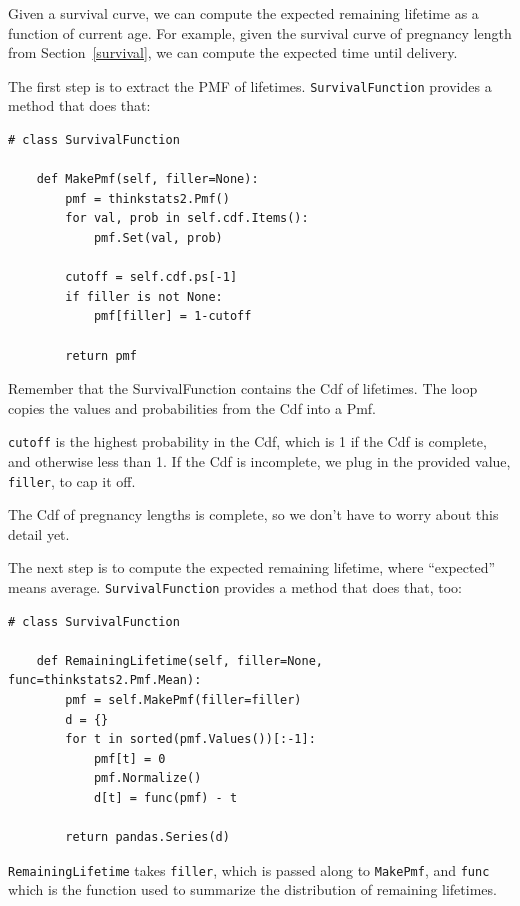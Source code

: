\documentclass[12pt]{book}
\theoremstyle{exercise}
\begin{document}
Given a survival curve, we can compute the expected remaining
lifetime as a function of current age.  For example, given the
survival curve of pregnancy length from Section~\ref{survival},
we can compute the expected time until delivery.%

The first step is to extract the PMF of lifetimes.  {\tt SurvivalFunction}
provides a method that does that:

\begin{verbatim}
# class SurvivalFunction

    def MakePmf(self, filler=None):
        pmf = thinkstats2.Pmf()
        for val, prob in self.cdf.Items():
            pmf.Set(val, prob)

        cutoff = self.cdf.ps[-1]
        if filler is not None:
            pmf[filler] = 1-cutoff

        return pmf
\end{verbatim}

Remember that the SurvivalFunction contains the Cdf of lifetimes.
The loop copies the values and probabilities from the Cdf into
a Pmf.%
%

{\tt cutoff} is the highest probability in the Cdf, which is 1
if the Cdf is complete, and otherwise less than 1.  
If the Cdf is incomplete, we plug in the provided value, {\tt filler},
to cap it off.

The Cdf of pregnancy lengths is complete, so we don't have to worry
about this detail yet.%

The next step is to compute the expected remaining lifetime, where
``expected'' means average.  {\tt SurvivalFunction}
provides a method that does that, too:%

\begin{verbatim}
# class SurvivalFunction

    def RemainingLifetime(self, filler=None, func=thinkstats2.Pmf.Mean):
        pmf = self.MakePmf(filler=filler)
        d = {}
        for t in sorted(pmf.Values())[:-1]:
            pmf[t] = 0
            pmf.Normalize()
            d[t] = func(pmf) - t

        return pandas.Series(d)
\end{verbatim}

{\tt RemainingLifetime} takes {\tt filler}, which is passed along
to {\tt MakePmf}, and {\tt func} which is the function used to
summarize the distribution of remaining lifetimes.
\end{document}
